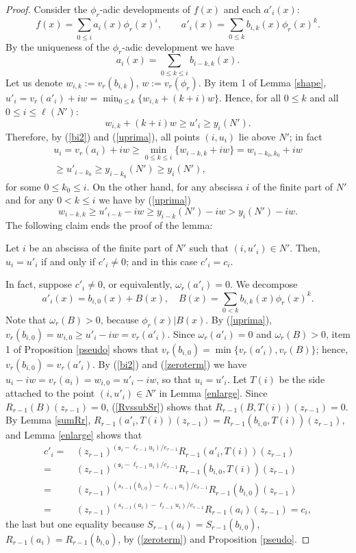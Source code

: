 \documentclass{amsart}
\def\e{\medskip}
\def\om{\omega}
\begin{document}
\begin{proof}
Consider the $\phi_r$-adic developments of $f(x)$ and each $a'_i(x)$:
$$
f(x)=\sum_{0\le i}a_i(x)\phi_r(x)^i,\qquad a'_i(x)=\sum_{0\le k}b_{i,k}(x)\phi_r(x)^k.
$$
By the uniqueness of the $\phi_r$-adic development we have
\begin{equation}\label{bi2}
a_i(x)=\sum_{0\le k\le i}b_{i-k,k}(x).
\end{equation}
Let us denote $w_{i,k}:=v_r(b_{i,k})$, $w:=v_r(\phi_r)$. By item 1 of Lemma \ref{shape},
$u'_i=v_r(a'_i)+iw=\min_{0\le k}\{w_{i,k}+(k+i)w\}$. Hence, for all $0\le k$ and all $0\le i\le \ell(N')$:
\begin{equation}\label{uprima}
w_{i,k}+(k+i)w\ge u'_i\ge y_i(N').
\end{equation}
Therefore, by (\ref{bi2}) and (\ref{uprima}), all points $(i,u_i)$ lie above $N'$; in fact
\begin{multline}\label{uuprima}
u_i=v_r(a_i)+iw\ge \min_{0\le k\le i}\{w_{i-k,k}+iw\}=w_{i-k_0,k_0}+iw\\
\ge u'_{i-k_0}\ge y_{i-k_0}(N')\ge  y_i(N'),
\end{multline}
for some $0\le k_0\le i$. On the other hand, for any abscissa $i$ of the finite part of $N'$ and for any $0<k\le i$ we have by (\ref{uprima})
\begin{equation}\label{zeroterm}
w_{i-k,k}\ge u'_{i-k}-iw \ge y_{i-k}(N')-iw>y_i(N')-iw. 
\end{equation}
The following claim ends the proof of the lemma:\e 

Let $i$ be an abscissa of the finite part of $N'$ such that $(i,u'_i)\in N'$. Then, $u_i=u'_i$ if and only if $c'_i\ne0$; and in this case $c'_i=c_i$.

In fact, suppose $c'_i\ne0$, or equivalently, $\om_r(a'_i)=0$. We decompose
$$
a'_i(x)=b_{i,0}(x)+B(x),\quad B(x)=\sum_{0< k}b_{i,k}(x)\phi_r(x)^k.
$$
Note that $\om_r(B)>0$, because $\phi_r(x)|B(x)$. By (\ref{uprima}), $v_r(b_{i,0})=w_{i,0}\ge u'_i-iw=v_r(a'_i)$. Since $\om_r(a'_i)=0$ and $\om_r(B)>0$, item 1 of Proposition \ref{pseudo} shows that $v_r(b_{i,0})=\min\{v_r(a'_i),v_r(B)\}$; hence, $v_r(b_{i,0})=v_r(a'_i)$. By (\ref{bi2}) and (\ref{zeroterm}) we have $u_i-iw=v_r(a_i)=w_{i,0}=u'_i-iw$, so that $u_i=u'_i$.
Let $T(i)$ be the side attached to the point $(i,u'_i)\in N'$ in Lemma \ref{enlarge}. Since $R_{r-1}(B)(z_{r-1})=0$, (\ref{RvssubSr})
shows that $R_{r-1}(B,T(i))(z_{r-1})=0$. By Lemma \ref{sumRr}, $R_{r-1}(a'_i,T(i))(z_{r-1})=R_{r-1}(b_{i,0},T(i))(z_{r-1})$, and Lemma \ref{enlarge} shows that
\begin{align*}
c'_i=&\,(z_{r-1})^{(\mathfrak{s}_i-\ell_{r-1} u_i)/e_{r-1}}R_{r-1}(a'_i,T(i))(z_{r-1})\\
=&\,(z_{r-1})^{(\mathfrak{s}_i-\ell_{r-1} u_i)/e_{r-1}}R_{r-1}(b_{i,0},T(i))(z_{r-1})
\\=&\,(z_{r-1})^{(s_{r-1}(b_{i,0})-\ell_{r-1} u_i)/e_{r-1}}R_{r-1}(b_{i,0})(z_{r-1})\\
=&\,(z_{r-1})^{(s_{r-1}(a_i)-\ell_{r-1} u_i)/e_{r-1}}R_{r-1}(a_i)(z_{r-1})=c_i,
\end{align*}
the last but one equality because $S_{r-1}(a_i)=S_{r-1}(b_{i,0})$, $R_{r-1}(a_i)=R_{r-1}(b_{i,0})$, by (\ref{zeroterm}) and Proposition \ref{pseudo}.


\end{proof}
\end{document}

